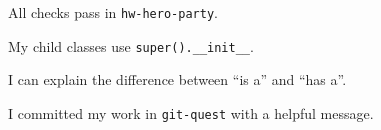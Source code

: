 \begin{selfcheck}
  \item All checks pass in \texttt{hw-hero-party}.
  \item My child classes use \texttt{super().\_\_init\_\_}.
  \item I can explain the difference between \enquote{is a} and \enquote{has a}.
  \item I committed my work in \texttt{git-quest} with a helpful message.
\end{selfcheck}
